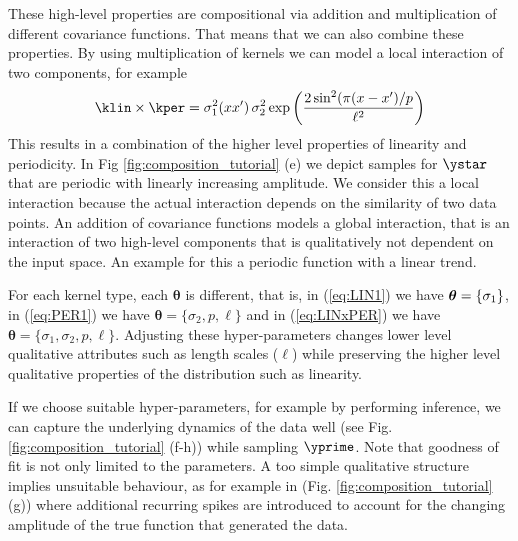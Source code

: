 These high-level properties are compositional via addition and multiplication of different covariance functions. 
That means that we can also combine these properties.
By using multiplication of kernels we can model a local interaction of two components, for example 
\begin{equation}\label{eq:LINxPER}
    \klin \times \kper =  \sigma_1^2(x x^\prime)\, \sigma_2^2 \exp \bigg( \frac{2 \sin^2 ( \pi (x - x^\prime)/p}{\ell^2} \bigg) 
\end{equation}
This results in a combination of the higher level properties of linearity and  periodicity.
In Fig \ref{fig:composition_tutorial} (e) we depict samples for $\ystar$ that are periodic
with linearly increasing amplitude.
We consider this a local interaction because the actual interaction depends on the similarity
of two data points.
An addition of covariance functions models a global interaction, that is an interaction of two high-level components that is qualitatively not dependent on the input space. An example for this a periodic function with a linear
trend.

For each kernel type, each $\bm{\theta}$ is different, that is, in (\ref{eq:LIN1}) we have $\bm{\theta}=\{\sigma_1\}$,
in (\ref{eq:PER1}) we have $\bm{\theta}=\{\sigma_2,p,\ell\}$ and in 
(\ref{eq:LINxPER}) we have $\bm{\theta}=\{\sigma_1,\sigma_2,p,\ell\}$.
Adjusting these hyper-parameters changes lower level qualitative attributes such as length
scales ($\ell$) while preserving the higher level qualitative properties of the distribution
such as linearity.

If we choose suitable hyper-parameters, for example by performing inference, we
can capture the underlying dynamics of the data well (see Fig.
\ref{fig:composition_tutorial} (f-h)) while sampling $\yprime$.
Note that goodness of fit is not only limited to the parameters. A too simple qualitative structure
implies unsuitable behaviour, as for example in (Fig. \ref{fig:composition_tutorial} (g)) where additional 
recurring spikes are introduced to account for the changing amplitude of the true function that 
generated the data.





